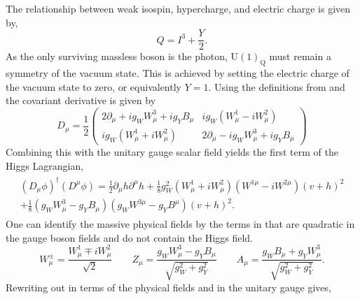 The relationship between weak isospin, hypercharge, and electric charge is given by,
\begin{equation}
	\label{eq:hypercharge}
	Q = I^3 + \frac{Y}{2}.
\end{equation}
As the only surviving massless boson is the photon, $\text{U}(1)_\text{Q}$ must remain a symmetry of the vacuum state.
This is achieved by setting the electric charge of the vacuum state to zero, or equivalently $Y=1$.
Using the definitions from  and  the covariant derivative is given by
\begin{equation}
	\label{eq:higgs_covariant_derivative}
	D_\mu = \frac{1}{2}
	\begin{pmatrix}
		2 \partial_\mu + i g_W W_\mu^3 + i g_Y B_\mu &
		i g_W (W_\mu^1 - i W_\mu^2)                    \\
		i g_W (W_\mu^1 + i W_\mu^2)                  &
		2 \partial_\mu - i g_W W_\mu^3 + i g_Y B_\mu
	\end{pmatrix}
\end{equation}
Combining this with the unitary gauge scalar field yields the first term of the Higgs Lagrangian,
\begin{align}
	\label{eq:higgs_lagrangian_1}
	\begin{split}
		(D_\mu \phi)^\dagger (D^\mu \phi) =
		\frac{1}{2} \partial_\mu h \partial^\mu h
		+ \frac{1}{8} g_W^2 (W_\mu^1 + i W_\mu^2)(W^{1\mu} - i W^{2\mu})(v + h)^2
		\\
		+ \frac{1}{8} (g_W W_\mu^3 - g_Y B_\mu)(g_W W^{3\mu} - g_Y B^\mu)(v + h)^2.
	\end{split}
\end{align}
One can identify the massive physical fields by the terms in  that are quadratic in the gauge boson fields and do not contain the Higgs field.
\begin{equation}
	W^\pm_\mu = \frac{W^1_\mu \mp i W^2_\mu}{\sqrt{2}}
	\qquad
	Z_\mu = \frac{g_W W^3_\mu - g_Y B_\mu}{\sqrt{g_W^2 + g_Y^2}}
	\qquad
	A_\mu = \frac{g_W B_\mu + g_Y W^3_\mu}{\sqrt{g_W^2 + g_Y^2}}.
\end{equation}
Rewriting out  in terms of the physical fields and in the unitary gauge gives,
